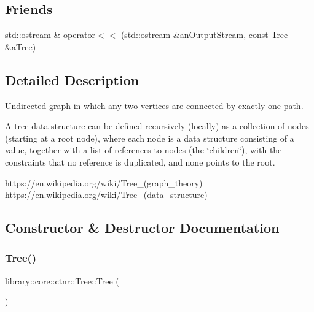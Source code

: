 \subsection*{Friends}
\begin{DoxyCompactItemize}
\item 
std\+::ostream \& \hyperlink{classlibrary_1_1core_1_1ctnr_1_1Tree_aca74cf66509d8f31b83b1c100cb00bea}{operator$<$$<$} (std\+::ostream \&an\+Output\+Stream, const \hyperlink{classlibrary_1_1core_1_1ctnr_1_1Tree}{Tree} \&a\+Tree)
\end{DoxyCompactItemize}


\subsection{Detailed Description}
Undirected graph in which any two vertices are connected by exactly one path. 

A tree data structure can be defined recursively (locally) as a collection of nodes (starting at a root node), where each node is a data structure consisting of a value, together with a list of references to nodes (the \char`\"{}children\char`\"{}), with the constraints that no reference is duplicated, and none points to the root.

https\+://en.wikipedia.\+org/wiki/\+Tree\+\_\+(graph\+\_\+theory) https\+://en.wikipedia.\+org/wiki/\+Tree\+\_\+(data\+\_\+structure) 

\subsection{Constructor \& Destructor Documentation}
\mbox{\label{classlibrary_1_1core_1_1ctnr_1_1Tree_a4bba7cf8925135d1fe4f24fabd07aec4}} 
\subsubsection{\texorpdfstring{Tree()}{Tree()}\hspace{0.1cm}{\footnotesize\ttfamily [1/2]}}
{\footnotesize\ttfamily library\+::core\+::ctnr\+::\+Tree\+::\+Tree (\begin{DoxyParamCaption}{ }\end{DoxyParamCaption})\hspace{0.3cm}{\ttfamily [delete]}}

